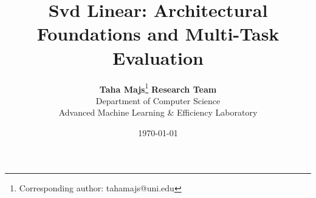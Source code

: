 \title{\textbf{Svd Linear: Architectural Foundations and Multi-Task Evaluation}}

\author{
  \textbf{Taha Majs}\thanks{Corresponding author: tahamajs@uni.edu} \quad \textbf{Research Team} \\
  Department of Computer Science \\
  Advanced Machine Learning \& Efficiency Laboratory
}

\date{\today}
